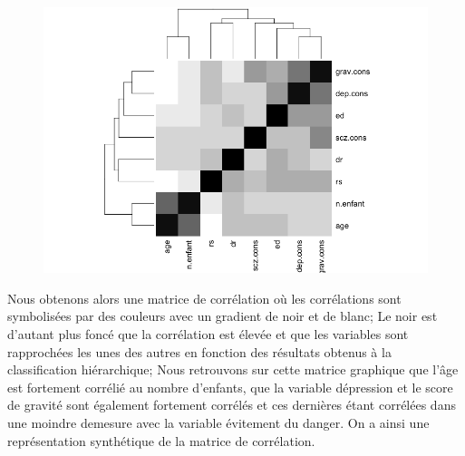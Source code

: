 \begin{figure}[H]\begin{center}\includegraphics[scale=0.5]{ilu/ClassGraphMatCor.png}\end{center}\end{figure}

Nous obtenons alors une matrice de corrélation où les corrélations sont symbolisées par des couleurs avec un gradient de noir et de blanc; Le noir est d'autant plus foncé que la corrélation est élevée et que les variables sont rapprochées les unes des autres en fonction des résultats obtenus à la classification hiérarchique; Nous retrouvons sur cette matrice graphique que l'âge est fortement corrélié au nombre d'enfants, que la variable dépression et le score de gravité sont également fortement corrélés et ces dernières étant corrélées dans une moindre demesure avec la variable évitement du danger.\newline
On a ainsi une représentation synthétique de la matrice de corrélation.

\newpage



\newpage\newpage
\newpage\newpage\newpage\newpage



